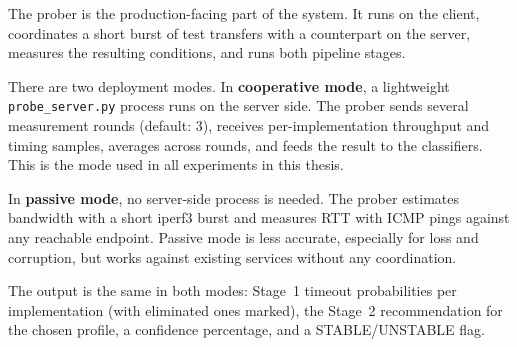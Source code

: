 The prober is the production-facing part of the system. It runs on the
client, coordinates a short burst of test transfers with a counterpart on
the server, measures the resulting conditions, and runs both pipeline stages.

There are two deployment modes. In \textbf{cooperative mode}, a lightweight
\texttt{probe\_server.py} process runs on the server side. The prober sends
several measurement rounds (default: 3), receives per-implementation
throughput and timing samples, averages across rounds, and feeds the result
to the classifiers. This is the mode used in all experiments in this thesis.

In \textbf{passive mode}, no server-side process is needed. The prober estimates
bandwidth with a short iperf3 burst and measures RTT with ICMP pings against
any reachable endpoint. Passive mode is less accurate, especially for loss
and corruption, but works against existing services without any coordination.

The output is the same in both modes: Stage~1 timeout probabilities per
implementation (with eliminated ones marked), the Stage~2 recommendation for
the chosen profile, a confidence percentage, and a STABLE/UNSTABLE flag.
